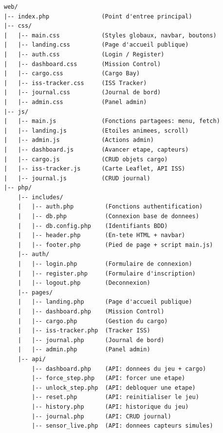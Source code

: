 \documentclass[12pt,a4paper]{article}
\begin{document}
\begin{lstlisting}[language={}, title={\texttt{web/} --- Arborescence complète}]
web/
|-- index.php               (Point d'entree principal)
|-- css/
|   |-- main.css            (Styles globaux, navbar, boutons)
|   |-- landing.css         (Page d'accueil publique)
|   |-- auth.css            (Login / Register)
|   |-- dashboard.css       (Mission Control)
|   |-- cargo.css           (Cargo Bay)
|   |-- iss-tracker.css     (ISS Tracker)
|   |-- journal.css         (Journal de bord)
|   |-- admin.css           (Panel admin)
|-- js/
|   |-- main.js             (Fonctions partagees: menu, fetch)
|   |-- landing.js          (Etoiles animees, scroll)
|   |-- admin.js            (Actions admin)
|   |-- dashboard.js        (Avancer etape, capteurs)
|   |-- cargo.js            (CRUD objets cargo)
|   |-- iss-tracker.js      (Carte Leaflet, API ISS)
|   |-- journal.js          (CRUD journal)
|-- php/
    |-- includes/
    |   |-- auth.php         (Fonctions authentification)
    |   |-- db.php           (Connexion base de donnees)
    |   |-- db.config.php    (Identifiants BDD)
    |   |-- header.php       (En-tete HTML + navbar)
    |   |-- footer.php       (Pied de page + script main.js)
    |-- auth/
    |   |-- login.php        (Formulaire de connexion)
    |   |-- register.php     (Formulaire d'inscription)
    |   |-- logout.php       (Deconnexion)
    |-- pages/
    |   |-- landing.php      (Page d'accueil publique)
    |   |-- dashboard.php    (Mission Control)
    |   |-- cargo.php        (Gestion du cargo)
    |   |-- iss-tracker.php  (Tracker ISS)
    |   |-- journal.php      (Journal de bord)
    |   |-- admin.php        (Panel admin)
    |-- api/
        |-- dashboard.php    (API: donnees du jeu + cargo)
        |-- force_step.php   (API: forcer une etape)
        |-- unlock_step.php  (API: debloquer une etape)
        |-- reset.php        (API: reinitialiser le jeu)
        |-- history.php      (API: historique du jeu)
        |-- journal.php      (API: CRUD journal)
        |-- sensor_live.php  (API: donnees capteurs simules)
\end{lstlisting}
\end{document}

